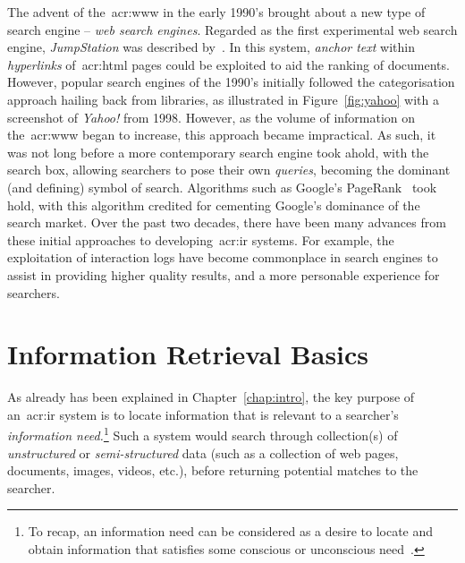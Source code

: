 The advent of the~\gls{acr:www} in the early 1990's brought about a new type of search engine -- \emph{web search engines}. Regarded as the first experimental web search engine, \emph{JumpStation} was described by~\cite{mcbryan1994taming_tools}. In this system, \emph{anchor text} within \emph{hyperlinks} of~\gls{acr:html} pages could be exploited to aid the ranking of documents. However, popular search engines of the 1990's initially followed the categorisation approach hailing back from libraries, as illustrated in Figure~\ref{fig:yahoo} with a screenshot of \emph{Yahoo!} from 1998. However, as the volume of information on the~\gls{acr:www} began to increase, this approach became impractical. As such, it was not long before a more contemporary search engine took ahold, with the search box, allowing searchers to pose their own \emph{queries}, becoming the dominant (and defining) symbol of search. Algorithms such as Google's PageRank~\citep{page1998pagerank} took hold, with this algorithm credited for cementing Google's dominance of the search market. Over the past two decades, there have been many advances from these initial approaches to developing~\gls{acr:ir} systems. For example, the exploitation of interaction logs have become commonplace in search engines to assist in providing higher quality results, and a more personable experience for searchers.

\section{Information Retrieval Basics}\label{sec:ir_background:basics}
As already has been explained in Chapter~\ref{chap:intro}, the key purpose of an~\gls{acr:ir} system is to locate information that is relevant to a searcher's \emph{information need.}\footnote{To recap, an information need can be considered as a desire to locate and obtain information that satisfies some conscious or unconscious need~\citep{hjorland1997information}.} Such a system would search through collection(s) of \emph{unstructured} or \emph{semi-structured} data (such as a collection of web pages, documents, images, videos, etc.), before returning potential matches to the searcher. 

